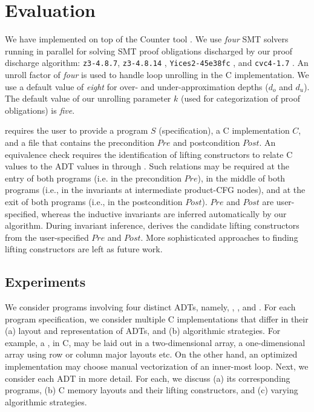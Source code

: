 \section{Evaluation}
\label{sec:eval}

We have implemented \toolName{} on top of the
Counter tool \cite{oopsla20}.
We use {\em four} SMT solvers running in parallel for solving
SMT proof obligations discharged by our proof discharge algorithm:
{\tt z3-4.8.7}, {\tt z3-4.8.14} \cite{z3},
{\tt Yices2-45e38fc} \cite{yices},
and {\tt cvc4-1.7} \cite{cvc4solver}.
An unroll factor of {\em four} is used to handle loop unrolling in the C implementation.
We use a default value of {\em eight} for
over- and under-approximation depths ($d_o$ and $d_u$).
The default value of
our unrolling parameter $k$ (used for categorization of proof obligations) is {\em five}.

\toolName{} requires the user to provide a \SpecL{} program $S$ (specification), a C implementation $C$,
and a file that contains the precondition $Pre$ and postcondition $Post$.
An equivalence check requires the identification of lifting constructors to relate C
values to the ADT values in \SpecL{} through  \recursiveRelations{}.
Such relations may be required at the entry of both programs (i.e. in the precondition $Pre$),
in the middle of both programs (i.e., in the invariants at intermediate product-CFG nodes),
and at the exit of both programs (i.e., in the postcondition $Post$).
$Pre$ and $Post$ are user-specified, whereas the inductive invariants are
inferred automatically by our algorithm.
During invariant inference, \toolName{} derives the candidate lifting constructors
from the user-specified $Pre$ and $Post$.
More sophisticated approaches to finding lifting constructors are left as future work.

\subsection{Experiments}
We consider programs involving four distinct ADTs, namely,
 ,  ,  
and  .
For each \SpecL{} program specification, we consider multiple
C implementations that differ in their (a) layout and representation of ADTs, and
(b) algorithmic strategies. For example, a , in C, may be laid out
in a two-dimensional array, a one-dimensional array using row or column major
layouts etc. On the other hand, an optimized implementation may choose manual vectorization
of an inner-most loop. Next, we consider each ADT in more detail. For each,
we discuss (a) its corresponding programs, (b) C memory layouts and their lifting
constructors, and (c) varying algorithmic strategies.

